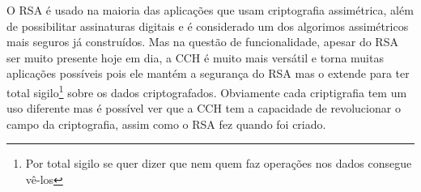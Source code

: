 O RSA é usado na maioria das aplicações que usam criptografia assimétrica, além de possibilitar assinaturas digitais e é considerado um dos algorimos assimétricos mais seguros já construídos.
Mas na questão de funcionalidade, apesar do RSA ser muito presente hoje em dia, a CCH é muito mais versátil e torna muitas aplicações possíveis pois ele mantém a segurança do RSA mas o extende para ter total sigilo\footnote{Por total sigilo se quer dizer que nem quem faz operações nos dados consegue vê-los} sobre os dados criptografados.
Obviamente cada criptigrafia tem um uso diferente mas é possível ver que a CCH tem a capacidade de revolucionar o campo da criptografia, assim como o RSA fez quando foi criado.